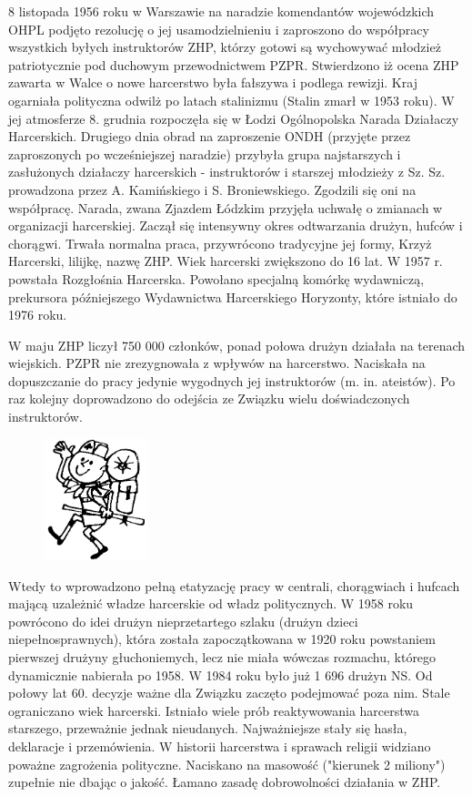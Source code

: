 8 listopada 1956 roku w Warszawie na naradzie komendantów wojewódzkich OHPL podjęto rezolucję o jej usamodzielnieniu i zaproszono do współpracy wszystkich byłych instruktorów ZHP, którzy gotowi są wychowywać młodzież patriotycznie pod duchowym przewodnictwem PZPR. Stwierdzono iż ocena ZHP zawarta w Walce o nowe harcerstwo była fałszywa i podlega rewizji. Kraj ogarniała polityczna odwilż po latach stalinizmu (Stalin zmarł w 1953 roku). W jej atmosferze 8. grudnia rozpoczęła się w Łodzi Ogólnopolska Narada Działaczy Harcerskich. Drugiego dnia obrad na zaproszenie ONDH (przyjęte przez zaproszonych po wcześniejszej naradzie) przybyła grupa najstarszych i zasłużonych działaczy harcerskich - instruktorów i starszej młodzieży z Sz. Sz. prowadzona przez A. Kamińskiego i S. Broniewskiego. Zgodzili się oni na współpracę. Narada, zwana Zjazdem Łódzkim przyjęła uchwałę o zmianach w organizacji harcerskiej. Zaczął się intensywny okres odtwarzania drużyn, hufców i chorągwi. Trwała normalna praca, przywrócono tradycyjne jej formy, Krzyż Harcerski, lilijkę, nazwę ZHP. Wiek harcerski zwiększono do 16 lat. W 1957 r. powstała Rozgłośnia Harcerska. Powołano specjalną komórkę wydawniczą, prekursora późniejszego Wydawnictwa Harcerskiego Horyzonty, które istniało do 1976 roku. 

W maju ZHP liczył 750 000 członków, ponad połowa drużyn działała na terenach wiejskich. PZPR nie zrezygnowała z wpływów na harcerstwo. Naciskała na dopuszczanie do pracy jedynie wygodnych jej instruktorów (m. in. ateistów). 
Po raz kolejny doprowadzono do odejścia ze Związku wielu doświadczonych instruktorów. 
\begin{figure}
  \begin{center}
    \includegraphics[width=3cm]{grafiki/majzhp.png}
  \end{center}
\end{figure}Wtedy to wprowadzono pełną etatyzację pracy w centrali, chorągwiach i hufcach mającą uzależnić władze harcerskie od władz politycznych. W 1958 roku powrócono do idei drużyn nieprzetartego szlaku (drużyn dzieci niepełnosprawnych), która została zapoczątkowana w 1920 roku powstaniem pierwszej drużyny głuchoniemych, lecz nie miała wówczas rozmachu, którego dynamicznie nabierała po 1958. W 1984 roku było już 1 696 drużyn NS. Od połowy lat 60. decyzje ważne dla Związku zaczęto podejmować poza nim. Stale ograniczano wiek harcerski. Istniało wiele prób reaktywowania harcerstwa starszego, przeważnie jednak nieudanych. Najważniejsze stały się hasła, deklaracje i przemówienia. W historii harcerstwa i sprawach religii widziano poważne zagrożenia polityczne. Naciskano na masowość ("kierunek 2 miliony") zupełnie nie dbając o jakość. Łamano zasadę dobrowolności działania w ZHP.

